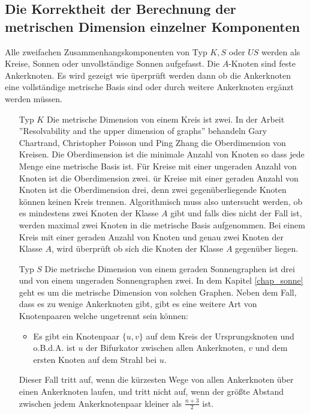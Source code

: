 \subsection{Die Korrektheit der Berechnung der metrischen Dimension einzelner Komponenten}
\label{korrkomp}
Alle zweifachen Zusammenhangskomponenten von Typ $K,S$ oder $US$ werden als Kreise, Sonnen oder unvollständige Sonnen aufgefasst. Die $A$-Knoten sind feste Ankerknoten. Es wird gezeigt wie üperprüft werden dann ob die Ankerknoten eine vollständige metrische Basis sind oder durch weitere Ankerknoten ergänzt werden müssen.
\begin{itemize}
\item[Typ $K$]
Die metrische Dimension von einem Kreis ist zwei. In der Arbeit ''Resolvability and the upper dimension of graphs'' \cite{upper} behandeln Gary Chartrand, Christopher Poisson und Ping Zhang die Oberdimension von Kreisen. Die Oberdimension ist die minimale Anzahl von Knoten so dass jede Menge eine metrische Basis ist.\newline
Für Kreise mit einer ungeraden Anzahl von Knoten ist die Oberdimension zwei.\newline
ür Kreise mit einer geraden Anzahl von Knoten ist die Oberdimension drei, denn zwei gegenüberliegende Knoten können keinen Kreis trennen. Algorithmisch muss also untersucht werden, ob es mindestens zwei Knoten der Klasse $A$ gibt und falls dies nicht der Fall ist, werden maximal zwei Knoten in die metrische Basis aufgenommen. Bei einem Kreis mit einer geraden Anzahl von Knoten und genau zwei Knoten der Klasse $A$, wird überprüft ob sich die Knoten der Klasse $A$ gegenüber liegen.
\item[Typ $S$]
Die metrische Dimension von einem geraden Sonnengraphen ist drei und von einem ungeraden Sonnengraphen zwei.
In dem Kapitel \ref{chap_sonne} geht es um die metrische Dimension von solchen Graphen. Neben dem Fall, dass es zu wenige Ankerknoten gibt, gibt es eine weitere Art von Knotenpaaren welche ungetrennt sein können:
\begin{itemize}
\item Es gibt ein Knotenpaar $\{u,v\}$ auf dem Kreis der Ursprungsknoten und o.B.d.A. ist $u$ der Bifurkator zwischen allen Ankerknoten, $v$ und dem ersten Knoten auf dem Strahl bei $u$.
\end{itemize}
Dieser Fall tritt auf, wenn die kürzesten Wege von allen Ankerknoten über einen Ankerknoten laufen, und tritt nicht auf, wenn der größte Abstand zwischen jedem Ankerknotenpaar kleiner als $\frac{n+3}{2}$ ist. 

\end{itemize}
